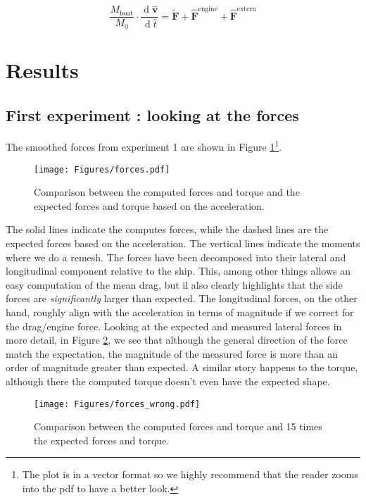 \documentclass[a4paper]{article}
\DeclareMathOperator{\newdiff}{d} %
\newcommand{\dif}{\newdiff\!}
\newcommand{\fdif}[2]{\dfrac{\dif #1}{\dif #2}}
\begin{document}
\[
	\dfrac{M_\text{boat}}{M_0} \cdot \fdif{\hat{\bm{v}}}{\hat{t}} = \bm{\tilde{F}} + \bm{\hat{F}}^\text{engine} +  \bm{\hat{F}}^\text{extern}
\]

\section{Results}
\subsection{First experiment : looking at the forces}
The smoothed forces from experiment 1 are shown in Figure \ref{fig:forces}\footnote{The plot is in a vector format so we highly recommend that the reader zooms into the pdf to have a better look.}. 
\begin{figure}[hbtb]
	\centering
	\texttt{[image: Figures/forces.pdf]}
	\caption{Comparison between the computed forces and torque and the expected forces and torque based on the acceleration.}
	\label{fig:forces}
\end{figure}
The solid lines indicate the computes forces, while the dashed lines are the expected forces based on the acceleration. The vertical lines indicate the moments where we do a remesh. The forces have been decomposed into their lateral and longitudinal component relative to the ship. This, among other things allows an easy computation of the mean drag, but il also clearly highlights that the side forces are \emph{significantly} larger than expected. The longitudinal forces, on the other hand, roughly align with the acceleration in terms of magnitude if we correct for the drag/engine force. Looking at the expected and measured lateral forces in more detail, in Figure \ref{fig:forces_wrong}, we see that although the general direction of the force match the expectation, the magnitude of the measured force is more than an order of magnitude greater than expected. A similar story happens to the torque, although there the computed torque doesn't even have the expected shape.
\begin{figure}[hbtb]
	\centering
	\texttt{[image: Figures/forces\_wrong.pdf]}
	\caption{Comparison between the computed forces and torque and 15 times the expected forces and torque.}
	\label{fig:forces_wrong}
\end{figure}
\end{document}
